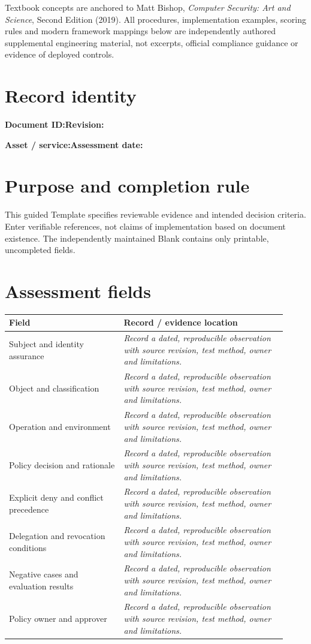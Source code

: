\documentclass[10pt,letterpaper]{article}
\begin{document}
\makedoctocpage
\begin{notebox}
Textbook concepts are anchored to Matt Bishop, \emph{Computer Security: Art and Science}, Second Edition (2019). All procedures, implementation examples, scoring rules and modern framework mappings below are independently authored supplemental engineering material, not excerpts, official compliance guidance or evidence of deployed controls.
\end{notebox}
\section{Record identity}
\textbf{Document ID:}\enspace\hrulefill\quad\textbf{Revision:}\enspace\hrulefill
\par\medskip\textbf{Asset / service:}\enspace\hrulefill\quad\textbf{Assessment date:}\enspace\hrulefill
\section{Purpose and completion rule}
This guided Template specifies reviewable evidence and intended decision criteria. Enter verifiable references, not claims of implementation based on document existence. The independently maintained Blank contains only printable, uncompleted fields.
\section{Assessment fields}
\renewcommand{\arraystretch}{1.8}
\begin{longtable}{@{}p{0.38\linewidth}p{0.54\linewidth}@{}}
\toprule\textbf{Field}&\textbf{Record / evidence location}\\\midrule\endhead
Subject and identity assurance & \emph{Record a dated, reproducible observation with source revision, test method, owner and limitations.}\\\midrule
Object and classification & \emph{Record a dated, reproducible observation with source revision, test method, owner and limitations.}\\\midrule
Operation and environment & \emph{Record a dated, reproducible observation with source revision, test method, owner and limitations.}\\\midrule
Policy decision and rationale & \emph{Record a dated, reproducible observation with source revision, test method, owner and limitations.}\\\midrule
Explicit deny and conflict precedence & \emph{Record a dated, reproducible observation with source revision, test method, owner and limitations.}\\\midrule
Delegation and revocation conditions & \emph{Record a dated, reproducible observation with source revision, test method, owner and limitations.}\\\midrule
Negative cases and evaluation results & \emph{Record a dated, reproducible observation with source revision, test method, owner and limitations.}\\\midrule
Policy owner and approver & \emph{Record a dated, reproducible observation with source revision, test method, owner and limitations.}\\\midrule
\bottomrule\end{longtable}
\end{document}
